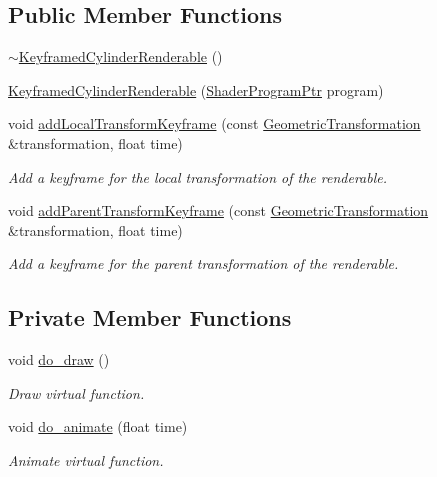 \subsection*{Public Member Functions}
\begin{DoxyCompactItemize}
\item 
\hyperlink{classKeyframedCylinderRenderable_a0ce1e2ce884579462524de5d60bc8200}{$\sim$\+Keyframed\+Cylinder\+Renderable} ()
\item 
\hyperlink{classKeyframedCylinderRenderable_abb362bfe0ad89b97e1a5657da6562f85}{Keyframed\+Cylinder\+Renderable} (\hyperlink{ShaderProgram_8hpp_af8e4af1ad4c53875ee5d32ab7e1f4966}{Shader\+Program\+Ptr} program)
\item 
void \hyperlink{classKeyframedCylinderRenderable_a15d31ab79223c27b090e891f078ac64b}{add\+Local\+Transform\+Keyframe} (const \hyperlink{classGeometricTransformation}{Geometric\+Transformation} \&transformation, float time)
\begin{DoxyCompactList}\small\item\em Add a keyframe for the local transformation of the renderable. \end{DoxyCompactList}\item 
void \hyperlink{classKeyframedCylinderRenderable_ae635ccde0bfc30285b5bd3f47a24b9ad}{add\+Parent\+Transform\+Keyframe} (const \hyperlink{classGeometricTransformation}{Geometric\+Transformation} \&transformation, float time)
\begin{DoxyCompactList}\small\item\em Add a keyframe for the parent transformation of the renderable. \end{DoxyCompactList}\end{DoxyCompactItemize}
\subsection*{Private Member Functions}
\begin{DoxyCompactItemize}
\item 
void \hyperlink{classKeyframedCylinderRenderable_abbfc6deaafd95aa58feb2c08b22d1050}{do\+\_\+draw} ()
\begin{DoxyCompactList}\small\item\em Draw virtual function. \end{DoxyCompactList}\item 
void \hyperlink{classKeyframedCylinderRenderable_a59d9e6dedbf2e4105c08a8b6516cdd56}{do\+\_\+animate} (float time)
\begin{DoxyCompactList}\small\item\em Animate virtual function. \end{DoxyCompactList}\end{DoxyCompactItemize}
